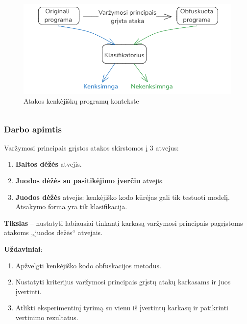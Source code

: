 \documentclass[12pt]{beamer}
\newcommand{\enquote}[1]{„#1“}
\begin{document}
\begin{frame}
\begin{columns}[b]
        \begin{figure}
            \begin{small}
                \begin{center}
                    \includegraphics[width=\textwidth]{resources/malware_adversarial.png}
                \end{center}
                \caption{Atakos kenkėjiškų programų kontekste}
                \label{fig:malware_adversarial}
            \end{small}
        \end{figure}
    \end{columns}

\end{frame}

\begin{frame}
    \frametitle{Darbo apimtis}

    Varžymosi principais grįstos atakos skirstomos į 3 atvejus:
    \begin{enumerate}
        \item \textbf{Baltos dėžės} atvejis.
        \item \textbf{Juodos dėžės su pasitikėjimo įverčiu} atvejis.
        \item \textbf{Juodos dėžės} atvejis: kenkėjiško kodo kūrėjas gali tik testuoti modelį. Atsakymo forma yra tik klasifikacija.
    \end{enumerate} \pause
    \vspace{10pt}

    \textbf{Tikslas} -- nustatyti labiausiai tinkantį karkasą varžymosi principais pagrįstoms atakoms \enquote{juodos dėžės} atvejais. \pause

    \textbf{Uždaviniai}:
    \begin{enumerate}
        \item Apžvelgti kenkėjiško kodo obfuskacijos metodus.
        \item Nustatyti kriterijus varžymosi principais grįstų atakų karkasams ir juos
              įvertinti.
        \item Atlikti eksperimentinį tyrimą su vienu iš įvertintų karkasų ir patikrinti
              vertinimo rezultatus.
    \end{enumerate}

\end{frame}
\end{document}
